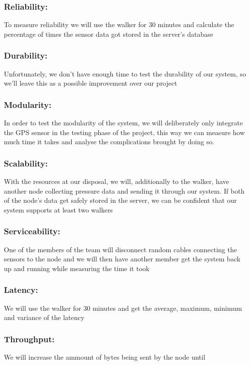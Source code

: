 \subsubsection{Reliability:}
To measure reliability we will use the walker for 30 minutes and calculate the percentage of times the sensor data got stored in the server’s database

\subsubsection{Durability:}
Unfortunately, we don’t have enough time to test the durability of our system, so we’ll leave this as a possible improvement over our project

\subsubsection{Modularity:}
In order to test the modularity of the system, we will deliberately only integrate the GPS sensor in the testing phase of the project, this way we can measure how much time it takes and analyse the complications brought by doing so.

\subsubsection{Scalability:}
With the resources at our disposal, we will, additionally to the walker, have another node collecting pressure data and sending it through our system. If both of the node’s data get safely stored in the server, we can be confident that our system supports at least two walkers

\subsubsection{Serviceability:}
One of the members of the team will disconnect random cables connecting the sensors to the node and we will then have another member get the system back up and running while measuring the time it took

\subsubsection{Latency:}
We will use the walker for 30 minutes and get the average, maximum, minimum and variance of the latency

\subsubsection{Throughput:}
We will increase the ammount of bytes being sent by the node until 

